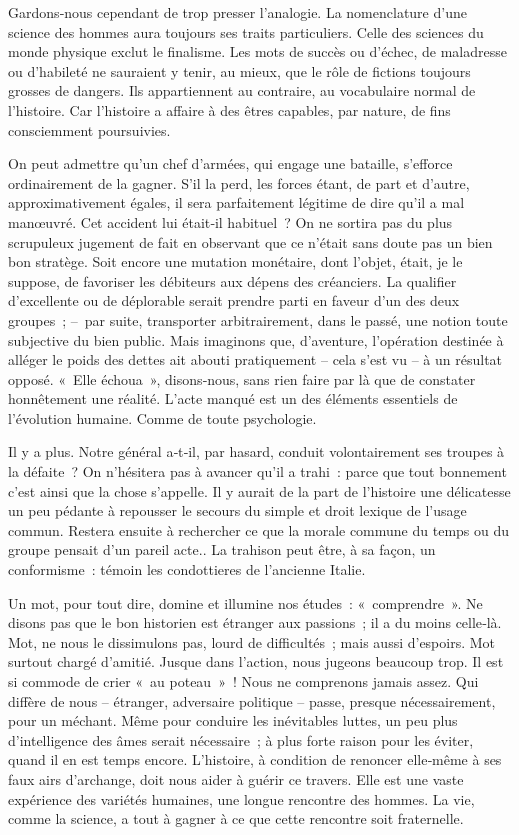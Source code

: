 \documentclass[french,twoside]{book} %
\newcommand{\astermono}{\medskip\centerline{\color{rubric}\large\selectfont{\syms ✻}}\medskip\par}%
\begin{document}
\astermono

\noindent Gardons‑nous cependant de trop presser l’analogie. La nomenclature d’une science des hommes aura toujours ses traits particuliers. Celle des sciences du monde physique exclut le finalisme. Les mots de succès ou d’échec, de maladresse ou d’habileté ne sauraient y tenir, au mieux, que le rôle de fictions toujours grosses de dangers. Ils appartiennent au con­traire, au vocabulaire normal de l’histoire. Car l’histoire a affaire à des êtres capables, par nature, de fins consciemment poursuivies.\par
On peut admettre qu’un chef d’armées, qui engage une bataille, s’efforce ordinairement de la gagner. S’il la perd, les forces étant, de part et d’autre, approximativement égales, il sera parfaitement légitime de dire qu’il a mal manœuvré. Cet accident lui était‑il habituel ? On ne sortira pas du plus scrupuleux jugement de fait en observant que ce n’était sans doute pas un bien bon stratège. Soit encore une mutation monétaire, dont l’objet, était, je le suppose, de favoriser les débiteurs aux dépens des créanciers. La qualifier d’excellente ou de déplorable serait prendre parti en faveur  
\label{p72} d’un des deux groupes ; – par suite, transporter arbitrairement, dans le passé, une notion toute subjective du bien public. Mais imaginons que, d’aventure, l’opération destinée à alléger le poids des dettes ait abouti pratiquement – cela s’est vu – à un résultat opposé. « Elle échoua », disons‑nous, sans rien faire par là que de constater honnêtement une réalité. L’acte manqué est un des éléments essentiels de l’évolution humaine. Comme de toute psychologie.\par
Il y a plus. Notre général a‑t‑il, par hasard, conduit volontairement ses troupes à la défaite ? On n’hésitera pas à avancer qu’il a trahi : parce que tout bonnement c’est ainsi que la chose s’appelle. Il y aurait de la part de l’histoire une délicatesse un peu pédante à repousser le secours du simple et droit lexique de l’usage commun. Restera ensuite à rechercher ce que la morale commune du temps ou du groupe pensait d’un pareil acte.. La trahison peut être, à sa façon, un conformisme : témoin les condottieres de l’ancienne Italie.\par
Un mot, pour tout dire, domine et illumine nos études : « comprendre ». Ne disons pas que le bon historien est étranger aux passions ; il a du moins celle‑là. Mot, ne nous le dissimulons pas, lourd de difficultés ; mais aussi d’espoirs. Mot surtout chargé d’amitié. Jusque dans l’action, nous jugeons beaucoup trop. Il est si commode de crier « au poteau » ! Nous ne comprenons jamais assez. Qui diffère de nous – étranger, adver­saire politique – passe, presque nécessairement, pour un méchant. Même pour conduire les inévitables luttes, un peu plus d’intelligence des âmes serait nécessaire ; à plus forte raison pour les éviter, quand il en est temps encore. L’histoire, à condition de renoncer elle‑même à ses faux airs d’ar­change, doit nous aider à guérir ce travers. Elle est une vaste expérience des variétés humaines, une longue rencontre des hommes. La vie, comme la science, a tout à gagner à ce que cette rencontre soit fraternelle.
\end{document}
